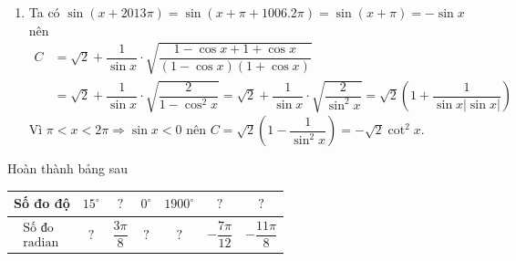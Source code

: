\begin{bt}
{\begin{enumerate}
			\item Ta có $\sin (x+2013 \pi)=\sin (x+\pi+1006.2 \pi)=\sin (x+\pi)=-\sin x$ nên
			$$
			\begin{aligned}
				C&=\sqrt{2} +\dfrac{1}{\sin x} \cdot \sqrt{\dfrac{1-\cos x+1+\cos x}{(1-\cos x)(1+\cos x)}} \\
				& =\sqrt{2}+\dfrac{1}{\sin x} \cdot \sqrt{\dfrac{2}{1-\cos ^2 x}}=\sqrt{2}+\dfrac{1}{\sin x} \cdot \sqrt{\dfrac{2}{\sin ^2 x}}=\sqrt{2}\left(1+\dfrac{1}{\sin x|\sin x|}\right)
			\end{aligned}
			$$
			Vì $\pi<x<2 \pi \Rightarrow \sin x<0$ nên
			$C=\sqrt{2}\left(1-\dfrac{1}{\sin ^2 x}\right)=-\sqrt{2} \cot ^2 x.$
		\end{enumerate}
	}
\end{bt}

\begin{bt}%
	Hoàn thành bảng sau
	\begin{center}
		\begin{tabular}{|l|c|c|c|c|c|c|}
			\hline Số đo độ & $15^{\circ}$ & $?$ & $0^{\circ}$ & $1900^{\circ}$ & $?$ & $?$ \\
			\hline $\begin{array}{c}\text { Số đo } \\
				\text { radian }\end{array}$ & $?$ & $\dfrac{3 \pi}{8}$ & $?$ & $?$ & $-\dfrac{7 \pi}{12}$ & $-\dfrac{11 \pi}{8}$ \\
			\hline
		\end{tabular}
		

\end{center}
\end{bt}
